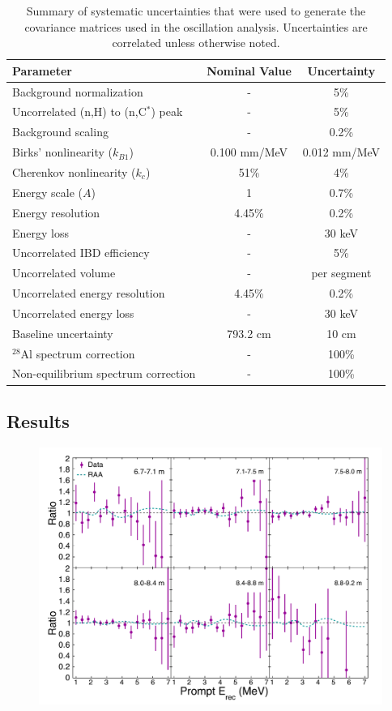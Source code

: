 \begin{table}[H]
\centering
\begin{tabular}{lcc}
	\hline 
	\textbf{Parameter} & \textbf{Nominal Value} & \textbf{Uncertainty} \\ 
	\hline 
	Background normalization  & - & 5\% \\ 
	Uncorrelated (n,H) to (n,C$^*$) peak & - & 5\% \\ 
	Background scaling & - & 0.2\% \\ 
	\hline 
	Birks' nonlinearity ($k_{B1}$) & 0.100 mm/MeV & 0.012 mm/MeV \\ 
	Cherenkov nonlinearity ($k_c$) & 51\% & 4\% \\ 
	Energy scale ($A$) & 1 & 0.7\% \\ 
	Energy resolution & 4.45\% & 0.2\% \\ 
	Energy loss & - & 30 keV \\ 
	Uncorrelated IBD efficiency & - & 5\% \\ 
	Uncorrelated volume & - & per segment \\ 
	Uncorrelated energy resolution & 4.45\% & 0.2\% \\ 
	Uncorrelated energy loss  & - & 30 keV \\ 
	Baseline uncertainty & 793.2 cm & 10 cm \\ 
	\hline 
	$^{28}$Al spectrum correction & - & 100\% \\ 
	Non-equilibrium spectrum correction & - & 100\% \\ 
	\hline 
\end{tabular} 
\caption{Summary of systematic uncertainties that were used to generate the covariance matrices used in the oscillation analysis. Uncertainties are correlated unless otherwise noted.}
\label{tab:sysunc}
\end{table}

\subsection{Results}




\newpage
\begin{figure}[H]
	\centering
	\includegraphics[width=0.7\linewidth]{tex/7-oscillation-images/BaselineSpectra}
	\caption{}
	\label{fig:baselinespectra}
\end{figure}


